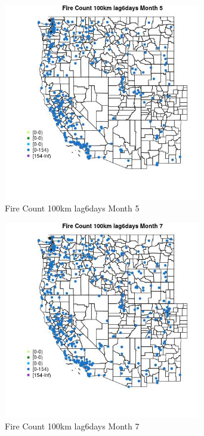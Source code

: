 \begin{figure} 
\centering  
\includegraphics[width=0.77\textwidth]{Code_Outputs/Report_ML_input_PM25_Step4_part_e_de_duplicated_aves_compiled_2019-05-18wNAs_MapObsMo5Fire_Count_100km_lag6days.jpg} 
\caption{\label{fig:Report_ML_input_PM25_Step4_part_e_de_duplicated_aves_compiled_2019-05-18wNAsMapObsMo5Fire_Count_100km_lag6days}Fire Count 100km lag6days Month 5} 
\end{figure} 
 

\begin{figure} 
\centering  
\includegraphics[width=0.77\textwidth]{Code_Outputs/Report_ML_input_PM25_Step4_part_e_de_duplicated_aves_compiled_2019-05-18wNAs_MapObsMo7Fire_Count_100km_lag6days.jpg} 
\caption{\label{fig:Report_ML_input_PM25_Step4_part_e_de_duplicated_aves_compiled_2019-05-18wNAsMapObsMo7Fire_Count_100km_lag6days}Fire Count 100km lag6days Month 7} 
\end{figure} 
 

